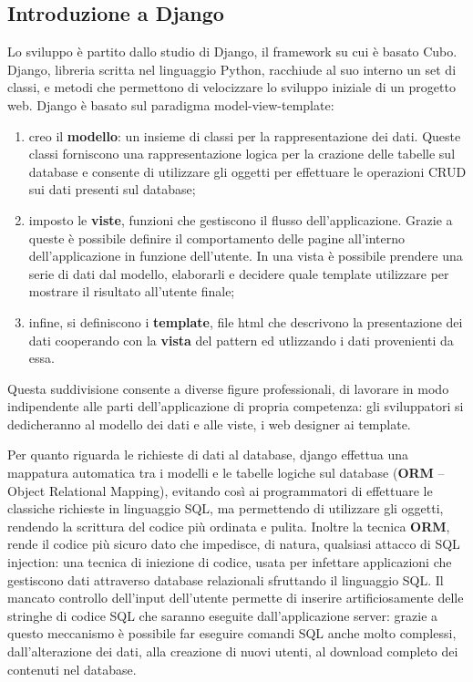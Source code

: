 \documentclass[12pt,a4paper]{article}
\begin{document}
\subsection{Introduzione a Django}

Lo sviluppo è partito dallo studio di Django, il framework su cui è basato Cubo.
Django, libreria scritta nel linguaggio Python, racchiude al suo interno un set di classi, e metodi che permettono di velocizzare lo sviluppo iniziale di un progetto web. Django è basato sul paradigma model-view-template:
\begin{enumerate}
    \item creo il \textbf{modello}: un insieme di classi per la rappresentazione dei dati. Queste classi forniscono una rappresentazione logica per la crazione delle tabelle sul database e consente di utilizzare gli oggetti per effettuare le operazioni CRUD sui dati presenti sul database;
    \item imposto le \textbf{viste}, funzioni che gestiscono il flusso dell’applicazione. Grazie a queste è possibile definire il comportamento delle pagine all’interno dell’applicazione in funzione dell'utente. In una vista è possibile prendere una serie di dati dal modello, elaborarli e decidere quale template utilizzare per mostrare il risultato all’utente finale;
    \item infine, si definiscono i \textbf{template}, file html che descrivono la presentazione dei dati cooperando con la \textbf{vista} del pattern ed utlizzando i dati provenienti da essa.
\end{enumerate}

Questa suddivisione consente a diverse figure professionali, di lavorare in modo indipendente alle parti dell’applicazione di propria competenza: gli sviluppatori si dedicheranno al modello dei dati e alle viste, i web designer ai template.

Per quanto riguarda le richieste di dati al database, django effettua una mappatura automatica tra i modelli e le tabelle logiche sul database (\textbf{ORM} -- Object Relational Mapping), evitando così ai programmatori di effettuare le classiche richieste in linguaggio SQL, ma permettendo di utilizzare gli oggetti, rendendo la scrittura del codice più ordinata e pulita. Inoltre la tecnica \textbf{ORM}, rende il codice più sicuro dato che impedisce, di natura, qualsiasi attacco di SQL injection: una tecnica di iniezione di codice, usata per infettare applicazioni che gestiscono dati attraverso database relazionali sfruttando il linguaggio SQL. Il mancato controllo dell'input dell'utente permette di inserire artificiosamente delle stringhe di codice SQL che saranno eseguite dall'applicazione server: grazie a questo meccanismo è possibile far eseguire comandi SQL anche molto complessi, dall'alterazione dei dati, alla creazione di nuovi utenti, al download completo dei contenuti nel database.
\end{document}
